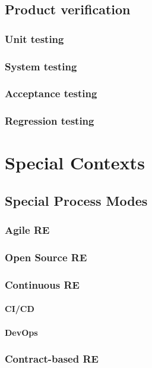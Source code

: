 \documentclass{reqengbook}
\begin{document}
\chapter{Product verification}
\section{Unit testing}
\section{System testing}
\section{Acceptance testing}
\section{Regression testing}

\part{Special Contexts}

\chapter{Special Process Modes}

\section{Agile RE}

\section{Open Source RE}

\section{Continuous RE}

\subsection{CI/CD}

\subsection{DevOps}

\section{Contract-based RE} 
\end{document}
